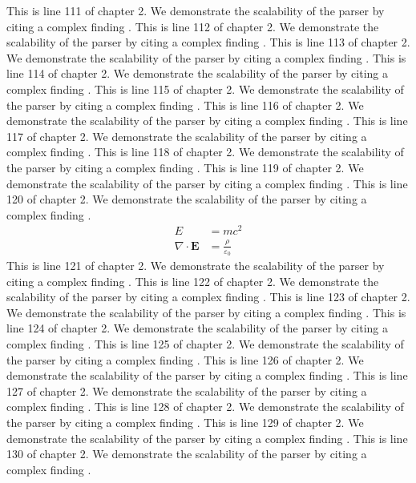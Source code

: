 This is line 111 of chapter 2. We demonstrate the scalability of the parser by citing a complex finding \cite{ref2_111}.
This is line 112 of chapter 2. We demonstrate the scalability of the parser by citing a complex finding \cite{ref2_112}.
This is line 113 of chapter 2. We demonstrate the scalability of the parser by citing a complex finding \cite{ref2_113}.
This is line 114 of chapter 2. We demonstrate the scalability of the parser by citing a complex finding \cite{ref2_114}.
This is line 115 of chapter 2. We demonstrate the scalability of the parser by citing a complex finding \cite{ref2_115}.
This is line 116 of chapter 2. We demonstrate the scalability of the parser by citing a complex finding \cite{ref2_116}.
This is line 117 of chapter 2. We demonstrate the scalability of the parser by citing a complex finding \cite{ref2_117}.
This is line 118 of chapter 2. We demonstrate the scalability of the parser by citing a complex finding \cite{ref2_118}.
This is line 119 of chapter 2. We demonstrate the scalability of the parser by citing a complex finding \cite{ref2_119}.
This is line 120 of chapter 2. We demonstrate the scalability of the parser by citing a complex finding \cite{ref2_120}.
\begin{align*}
  E &= mc^2 \\
  \nabla \cdot \mathbf{E} &= \frac{\rho}{\varepsilon_0}
\end{align*}
This is line 121 of chapter 2. We demonstrate the scalability of the parser by citing a complex finding \cite{ref2_121}.
This is line 122 of chapter 2. We demonstrate the scalability of the parser by citing a complex finding \cite{ref2_122}.
This is line 123 of chapter 2. We demonstrate the scalability of the parser by citing a complex finding \cite{ref2_123}.
This is line 124 of chapter 2. We demonstrate the scalability of the parser by citing a complex finding \cite{ref2_124}.
This is line 125 of chapter 2. We demonstrate the scalability of the parser by citing a complex finding \cite{ref2_125}.
This is line 126 of chapter 2. We demonstrate the scalability of the parser by citing a complex finding \cite{ref2_126}.
This is line 127 of chapter 2. We demonstrate the scalability of the parser by citing a complex finding \cite{ref2_127}.
This is line 128 of chapter 2. We demonstrate the scalability of the parser by citing a complex finding \cite{ref2_128}.
This is line 129 of chapter 2. We demonstrate the scalability of the parser by citing a complex finding \cite{ref2_129}.
This is line 130 of chapter 2. We demonstrate the scalability of the parser by citing a complex finding \cite{ref2_130}.
